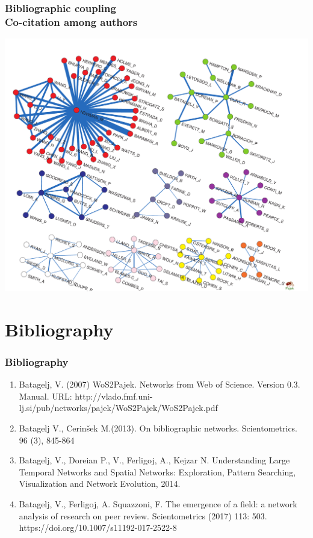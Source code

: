 \documentclass[hyperref={pdfstartview={FitBH -32768},
                         pdfpagemode=FullScreen,
                         plainpages=false,
                         colorlinks=true}
              ]{beamer}
\begin{document}
\begin{frame}[fragile]
\frametitle{Bibliographic coupling \\ \normalsize Co-citation among authors}

\begin{center}
\includegraphics[width=\textheight]{JacAu.pdf}
\end{center}

\end{frame}


\section{Bibliography}  


\begin{frame}[fragile]
\frametitle{Bibliography}
\small

\begin{enumerate}
\item Batagelj, V. (2007) WoS2Pajek. Networks from Web of Science. Version 0.3. Manual. URL: http://vlado.fmf.uni-lj.si/pub/networks/pajek/WoS2Pajek/WoS2Pajek.pdf

\item Batagelj V., Cerinšek M.(2013). On bibliographic networks. Scientometrics. 96 (3), 845-864

\item Batagelj, V., Doreian P., V., Ferligoj, A., Kejzar N. Understanding Large Temporal Networks and Spatial Networks: Exploration, Pattern Searching, Visualization and Network Evolution, 2014.

\item Batagelj, V., Ferligoj, A. Squazzoni, F. The emergence of a field: a network analysis of research on peer review. Scientometrics (2017) 113: 503. https://doi.org/10.1007/s11192-017-2522-8  

\end{enumerate}
\end{frame}
\end{document}
